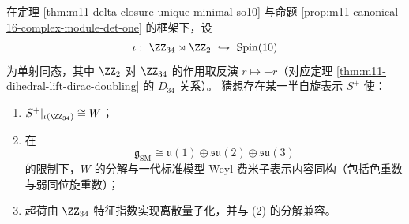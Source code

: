 \begin{conjecture}[\texorpdfstring{$m=11$}{m=11} 的 \texorpdfstring{$16$}{16} 模作为 \texorpdfstring{$\mathrm{Spin}(10)$}{Spin(10)} 半自旋离散骨架]\label{conj:m11-spin10-halfspin-discrete-skeleton}
在定理 \ref{thm:m11-delta-closure-unique-minimal-so10} 与命题 \ref{prop:m11-canonical-16-complex-module-det-one} 的框架下，设
\[
\iota:\ \ZZ_{34}\rtimes \ZZ_2\ \hookrightarrow\ \mathrm{Spin}(10)
\]
为单射同态，其中 \(\ZZ_2\) 对 \(\ZZ_{34}\) 的作用取反演 \(r\mapsto -r\)（对应定理 \ref{thm:m11-dihedral-lift-dirac-doubling} 的 \(D_{34}\) 关系）。
猜想存在某一半自旋表示 \(S^+\) 使：
\begin{enumerate}
  \item \(S^+|_{\iota(\ZZ_{34})}\cong W\)；
  \item 在
  \[
  \mathfrak g_{\mathrm{SM}}\cong
  \mathfrak u(1)\oplus\mathfrak{su}(2)\oplus\mathfrak{su}(3)
  \]
  的限制下，\(W\) 的分解与一代标准模型 Weyl 费米子表示内容同构（包括色重数与弱同位旋重数）；
  \item 超荷由 \(\ZZ_{34}\) 特征指数实现离散量子化，并与 (2) 的分解兼容。
\end{enumerate}
\end{conjecture}

\endinput
